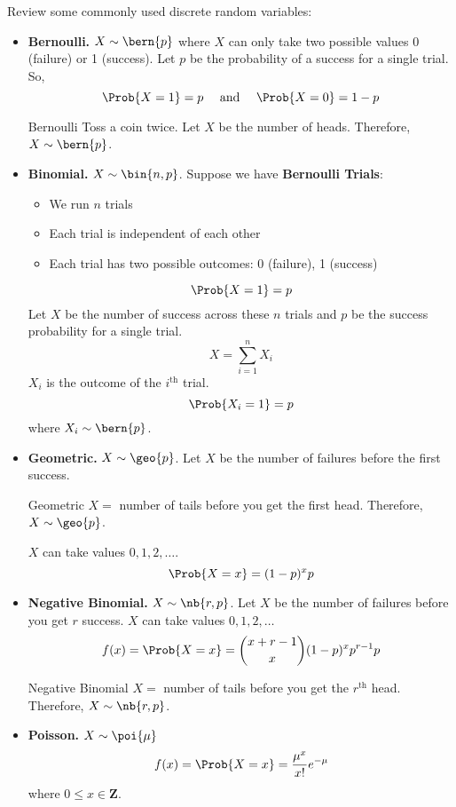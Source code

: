 Review some commonly used discrete random variables:
\begin{itemize}
    \item \textbf{Bernoulli.} $ X \sim \bern{p} $
          where $ X $ can only take two possible values 0 (failure) or 1 (success).
          Let $ p $ be the probability of a success for a single trial. So,
          \[ \Prob{X=1}=p\quad\text{ and }\quad \Prob{X=0}=1-p \]
          \begin{Example}{Bernoulli}{}
              Toss a coin twice. Let $ X $ be the number of heads.
              Therefore, $ X \sim \bern{p} $.
          \end{Example}
    \item \textbf{Binomial.} $ X \sim \bin{n,p} $. Suppose
          we have \textbf{Bernoulli Trials}:
          \begin{itemize}
              \item We run $ n $ trials
              \item Each trial is independent of each other
              \item Each trial has two possible outcomes: 0 (failure), 1 (success)
          \end{itemize}
          \[ \Prob{X=1}=p \]
          Let $ X $ be the number of success across these $ n $ trials
          and $ p $ be the success probability for a single trial.
          \[ X=\sum\limits_{i=1}^{n} X_i \]
          $ X_i $ is the outcome of the $ i^{\text{th}} $ trial.
          \[ \Prob{X_i=1}=p \]
          where $ X_i \sim \bern{p} $.
    \item \textbf{Geometric.} $ X \sim \geo{p} $.
          Let $ X $ be the number of failures before the first success.
          \begin{Example}{Geometric}{}
              $ X = $ number of tails before you get the first
              head. Therefore, $ X \sim \geo{p} $.
          \end{Example}
          $ X $ can take values $ 0,1,2,\ldots $.
          \[ \Prob{X=x}=(1-p)^x p \]
    \item \textbf{Negative Binomial.} $ X \sim \nb{r,p} $.
          Let $ X $ be the number of failures before you get $ r $ success.
          $ X $ can take values $ 0,1,2,\ldots $
          \[ f(x)=\Prob{X=x}=\binom{x+r-1}{x}(1-p)^x p^{r-1}p \]
          \begin{Example}{Negative Binomial}{}
              $ X= $ number of tails before you get the $ r^{\text{th}} $ head.
              Therefore, $ X \sim \nb{r,p} $.
          \end{Example}
    \item \textbf{Poisson.} $ X \sim \poi{\mu} $
          \[ f(x)=\Prob{X=x}=\frac{\mu^x}{x!} e^{-\mu} \]
          where $ 0\le x\in\mathbf{Z} $.
\end{itemize}

